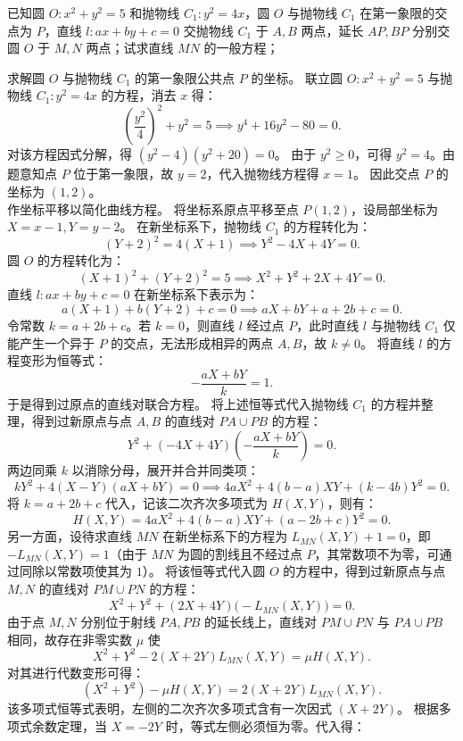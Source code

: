 \begin{example}
已知圆 \(O: x^2 + y^2 = 5\) 和抛物线 \(C_1: y^2 = 4x\)，圆 \(O\) 与抛物线 \(C_1\) 在第一象限的交点为 \(P\)，直线 \(l: ax + by + c = 0\) 交抛物线 \(C_1\) 于 \(A,B\) 两点，延长 \(AP,BP\) 分别交圆 \(O\) 于 \(M,N\) 两点；试求直线 \(MN\) 的一般方程；
\end{example}
\begin{solution}
求解圆 $O$ 与抛物线 $C_1$ 的第一象限公共点 $P$ 的坐标。
联立圆 $O: x^2 + y^2 = 5$ 与抛物线 $C_1: y^2 = 4x$ 的方程，消去 $x$ 得：
\[ \left(\frac{y^2}{4}\right)^2 + y^2 = 5 \implies y^4 + 16y^2 - 80 = 0. \]
对该方程因式分解，得 $(y^2 - 4)(y^2 + 20) = 0$。
由于 $y^2 \ge 0$，可得 $y^2 = 4$。由题意知点 $P$ 位于第一象限，故 $y = 2$，代入抛物线方程得 $x = 1$。
因此交点 $P$ 的坐标为 $(1, 2)$。\\
作坐标平移以简化曲线方程。
将坐标系原点平移至点 $P(1, 2)$，设局部坐标为 $X = x - 1, Y = y - 2$。
在新坐标系下，抛物线 $C_1$ 的方程转化为：
\[ (Y + 2)^2 = 4(X + 1) \implies Y^2 - 4X + 4Y = 0. \]
圆 $O$ 的方程转化为：
\[ (X + 1)^2 + (Y + 2)^2 = 5 \implies X^2 + Y^2 + 2X + 4Y = 0. \]
直线 $l: ax + by + c = 0$ 在新坐标系下表示为：
\[ a(X + 1) + b(Y + 2) + c = 0 \implies aX + bY + a + 2b + c = 0. \]
令常数 $k = a + 2b + c$。若 $k = 0$，则直线 $l$ 经过点 $P$，此时直线 $l$ 与抛物线 $C_1$ 仅能产生一个异于 $P$ 的交点，无法形成相异的两点 $A, B$，故 $k \neq 0$。
将直线 $l$ 的方程变形为恒等式：
\[ -\frac{aX + bY}{k} = 1. \]
于是得到过原点的直线对联合方程。
将上述恒等式代入抛物线 $C_1$ 的方程并整理，得到过新原点与点 $A, B$ 的直线对 $PA \cup PB$ 的方程：
\[ Y^2 + (-4X + 4Y) \left( -\frac{aX + bY}{k} \right) = 0. \]
两边同乘 $k$ 以消除分母，展开并合并同类项：
\[ k Y^2 + 4(X - Y)(aX + bY) = 0 \implies 4a X^2 + 4(b - a) XY + (k - 4b) Y^2 = 0. \]
将 $k = a + 2b + c$ 代入，记该二次齐次多项式为 $H(X,Y)$，则有：
\[ H(X,Y) = 4a X^2 + 4(b - a) XY + (a - 2b + c) Y^2 = 0. \]
另一方面，设待求直线 $MN$ 在新坐标系下的方程为 $L_{MN}(X,Y) + 1 = 0$，即 $-L_{MN}(X,Y) = 1$（由于 $MN$ 为圆的割线且不经过点 $P$，其常数项不为零，可通过同除以常数项使其为 $1$）。
将该恒等式代入圆 $O$ 的方程中，得到过新原点与点 $M, N$ 的直线对 $PM \cup PN$ 的方程：
\[ X^2 + Y^2 + (2X + 4Y)\big( -L_{MN}(X,Y) \big) = 0. \]
由于点 $M, N$ 分别位于射线 $PA, PB$ 的延长线上，直线对 $PM \cup PN$ 与 $PA \cup PB$ 相同，故存在非零实数 $\mu$ 使
\[ X^2 + Y^2 - 2(X + 2Y) L_{MN}(X,Y) = \mu H(X,Y). \]
对其进行代数变形可得：
\[ (X^2 + Y^2) - \mu H(X,Y) = 2(X + 2Y) L_{MN}(X,Y). \]
该多项式恒等式表明，左侧的二次齐次多项式含有一次因式 $(X + 2Y)$。
根据多项式余数定理，当 $X = -2Y$ 时，等式左侧必须恒为零。代入得：

\end{solution}

